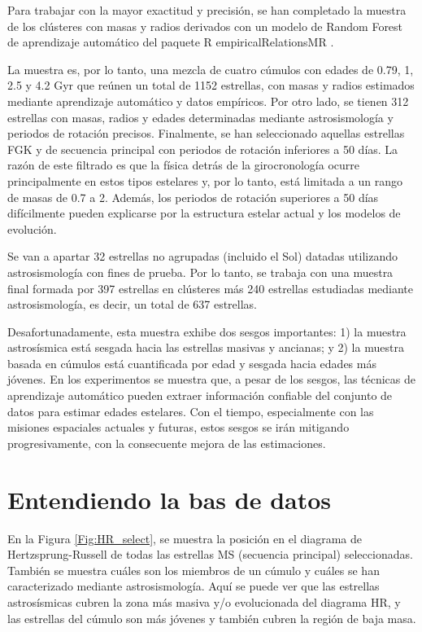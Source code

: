 Para trabajar con la mayor exactitud y precisión, se han completado la muestra de los clústeres con masas y radios derivados con un modelo de Random Forest de aprendizaje automático del paquete R empiricalRelationsMR \cite{Moya18}.


La muestra es, por lo tanto, una mezcla de cuatro cúmulos con edades de 0.79, 1, 2.5 y 4.2 Gyr que reúnen un total de 1152 estrellas, con masas y radios estimados mediante aprendizaje automático y datos empíricos. Por otro lado, se tienen 312 estrellas con masas, radios y edades determinadas mediante astrosismología y periodos de rotación precisos. Finalmente, se han seleccionado aquellas estrellas FGK y de secuencia principal con periodos de rotación inferiores a 50 días. La razón de este filtrado es que la física detrás de la girocronología ocurre principalmente en estos tipos estelares y, por lo tanto, está limitada a un rango de masas de 0.7 a 2. Además, los periodos de rotación superiores a 50 días difícilmente pueden explicarse por la estructura estelar actual y los modelos de evolución.

Se van a apartar 32 estrellas no agrupadas (incluido el Sol) datadas utilizando astrosismología con fines de prueba. Por lo tanto, se trabaja con una muestra final formada por 397 estrellas en clústeres más 240 estrellas estudiadas mediante astrosismología, es decir, un total de 637 estrellas.

Desafortunadamente, esta muestra exhibe dos sesgos importantes: 1) la muestra astrosísmica está sesgada hacia las estrellas masivas y ancianas; y 2) la muestra basada en cúmulos está cuantificada por edad y sesgada hacia edades más jóvenes. En los experimentos se muestra que, a pesar de los sesgos, las técnicas de aprendizaje automático pueden extraer información confiable del conjunto de datos para estimar edades estelares. Con el tiempo, especialmente con las misiones espaciales actuales y futuras, estos sesgos se irán mitigando progresivamente, con la consecuente mejora de las estimaciones.


\section{Entendiendo la bas de datos}

En la Figura \ref{Fig:HR_select}, se muestra la posición en el diagrama de Hertzsprung-Russell de todas las estrellas MS (secuencia principal) seleccionadas. También se muestra cuáles son los miembros de un cúmulo y cuáles se han caracterizado mediante astrosismología. Aquí se puede ver que las estrellas astrosísmicas cubren la zona más masiva y/o evolucionada del diagrama HR, y las estrellas del cúmulo son más jóvenes y también cubren la región de baja masa.

